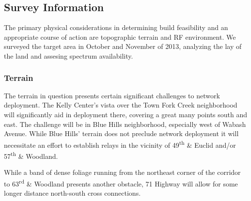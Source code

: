 \subsection{Survey Information}
The primary physical considerations in determining build feasibility and an
appropriate course of action are topographic terrain and RF environment. We
surveyed the target area in October and November of 2013, analyzing the lay of the land
and assesing spectrum availability. \par
\subsubsection{Terrain}
The terrain in question presents certain significant challenges to network
deployment. The Kelly Center's vista over the Town Fork Creek neighborhood
will significantly aid in deployment there, covering a great many points
south and east. The challenge will be in Blue Hills neighborhood, especially 
west of Wabash Avenue. While Blue Hills' terrain does not preclude network deployment
it will necessitate an effort to establish relays in the vicinity of 49\textsuperscript{th}
\& Euclid and/or 57\textsuperscript{th} \& Woodland.
\begin{center}
\end{center}
While a band of dense foliage running from the northeast corner of the corridor to 63\textsuperscript{rd} \& Woodland presents another obstacle, 71 Highway will allow for some longer distance north-south cross connections.

